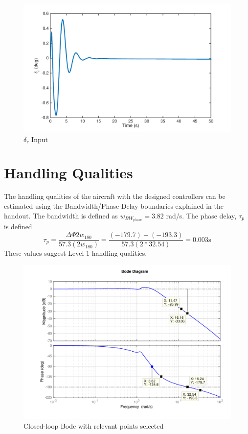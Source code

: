 \documentclass[12pt]{article}
\begin{document}
\begin{figure}[h!]
\begin{center}
\includegraphics[height=.4\textheight]{figures/delta_r}
\caption{$\delta_r$ Input}
\end{center}
\end{figure}

\section{Handling Qualities}
The handling qualities of the aircraft with the designed controllers can be estimated using the Bandwidth/Phase-Delay boundaries explained in the handout. The bandwidth is defined as $w_{BW_{phase}} = 3.82$ rad/s. The phase delay, $\tau_p$ is defined
\begin{equation*}
\tau_p = \dfrac{\Delta \Phi 2w_{180}}{57.3 (2w_{180})} = \dfrac{(-179.7) - (-193.3)}{57.3 (2*32.54)} = 0.003 \mbox{s}
\end{equation*}
These values suggest Level 1 handling qualities.
\begin{figure}[h!]
\begin{center}
\includegraphics[height=.4\textheight]{figures/all}
\caption{Closed-loop Bode with relevant points selected}
\end{center}
\end{figure}
\end{document}
